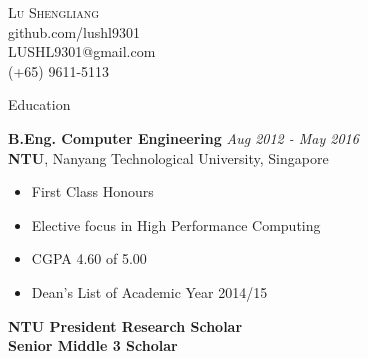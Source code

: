 \documentclass[a4paper, 12pt]{article}
\newenvironment{changemargin}[2]{%
  \begin{list}{}{%
      \setlength{\topsep}{0pt}%
      \setlength{\leftmargin}{#1}%
      \setlength{\rightmargin}{#2}%
      \setlength{\listparindent}{\parindent}%
      \setlength{\itemindent}{\parindent}%
      \setlength{\parsep}{\parskip}%
    }%
  \item[]}{\end{list}
}
\newcommand{\lineover}{
  \begin{changemargin}{-0.05in}{-0.05in}
    \vspace*{-8pt}
    \hrulefill \\
    \vspace*{-2pt}
  \end{changemargin}
}
\newcommand{\header}[1]{
  \begin{changemargin}{-0.6in}{-0.6in}
    \fontsize{15}{15}\scshape{#1}\\
    \lineover
    \vspace*{-4pt}
  \end{changemargin}
}
\newcommand{\contact}[5]{
  \begin{changemargin}{-0.5in}{-0.5in}
    \begin{center}
      {\LARGE \scshape {#1}}\\ \smallskip
      {#2}\\ \smallskip
      {#3}\\ \smallskip
      {#4}   \smallskip
    \end{center}
  \end{changemargin}
}
\newenvironment{body}
{
\vspace*{-16pt}
\begin{changemargin}{-0.25in}{-0.5in}
}
{
\end{changemargin}
}
\begin{document}
\contact{Lu Shengliang}{github.com/lushl9301}{LUSHL9301@gmail.com}{(+65) 9611-5113}





\header{Education}
\begin{body}
  \vspace{14pt}
  \textbf{B.Eng. Computer Engineering} \hfill \emph{Aug 2012 - May 2016} \\
  \textbf{NTU}, Nanyang Technological University, Singapore\\
  \begin{itemize} \itemsep -0pt  \small
  \vspace*{-4pt}
  \item First Class Honours
  \item Elective focus in High Performance Computing
  \item CGPA 4.60 of 5.00
  \item Dean's List of Academic Year 2014/15
  \end{itemize}
  \textbf{NTU President Research Scholar}\\
  \smallskip
  \textbf{Senior Middle 3 Scholar}

\end{body}
\end{document}
